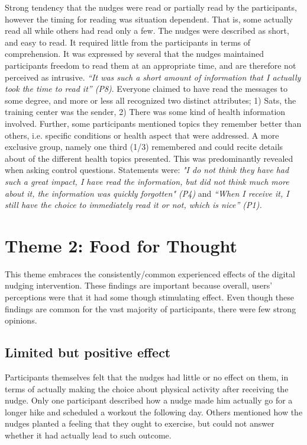 Strong tendency that the nudges were read or partially read by the participants, however the timing for reading was situation dependent. That is, some actually read all while others had read only a few. The nudges were described as short, and easy to read. It required little from the participants in terms of comprehension. It was expressed by several that the nudges maintained participants freedom to read them at an appropriate time, and are therefore not perceived as intrusive. \textit{“It was such a short amount of information that I actually took the time to read it” (P8)}. Everyone claimed to have read the messages to some degree, and more or less all recognized two distinct attributes; 1) Sats, the training center was the sender, 2) There was some kind of health information involved. Further, some participants mentioned topics they remember better than others, i.e. specific conditions or health aspect that were addressed. A more exclusive group, namely one third (1/3) remembered and could recite details about of the different health topics presented. This was predominantly revealed when asking control questions. Statements were:  \textit{"I do not think they have had such a great impact, I have read the information, but did not think much more about it, the information was quickly forgotten" (P4)} and \textit{“When I receive it, I still have the choice to immediately read it or not, which is nice” (P1). }

\section{Theme 2: Food for Thought }
This theme embraces the consistently/common experienced effects of the digital nudging intervention. These findings are important because overall, users' perceptions were that it had some though stimulating effect. Even though these findings are common for the vast majority of participants, there were few strong opinions. 

\subsection{Limited but positive effect }
Participants themselves felt that the nudges had little or no effect on them, in terms of actually making the choice about physical activity after receiving the nudge. Only one participant described how a nudge made him actually go for a longer hike and scheduled a workout the following day. Others mentioned how the nudges planted a feeling that they ought to exercise, but could not answer whether it had actually lead to such outcome.

